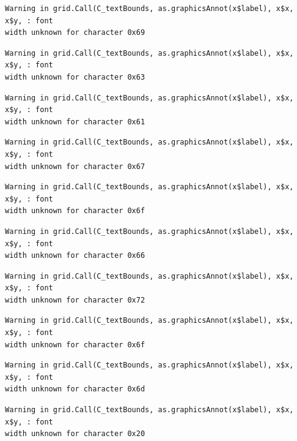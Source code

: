 \documentclass[
  letterpaper,
]{scrbook}
\begin{document}
\begin{verbatim}
Warning in grid.Call(C_textBounds, as.graphicsAnnot(x$label), x$x, x$y, : font
width unknown for character 0x69
\end{verbatim}

\begin{verbatim}
Warning in grid.Call(C_textBounds, as.graphicsAnnot(x$label), x$x, x$y, : font
width unknown for character 0x63
\end{verbatim}

\begin{verbatim}
Warning in grid.Call(C_textBounds, as.graphicsAnnot(x$label), x$x, x$y, : font
width unknown for character 0x61
\end{verbatim}

\begin{verbatim}
Warning in grid.Call(C_textBounds, as.graphicsAnnot(x$label), x$x, x$y, : font
width unknown for character 0x67
\end{verbatim}

\begin{verbatim}
Warning in grid.Call(C_textBounds, as.graphicsAnnot(x$label), x$x, x$y, : font
width unknown for character 0x6f
\end{verbatim}

\begin{verbatim}
Warning in grid.Call(C_textBounds, as.graphicsAnnot(x$label), x$x, x$y, : font
width unknown for character 0x66
\end{verbatim}

\begin{verbatim}
Warning in grid.Call(C_textBounds, as.graphicsAnnot(x$label), x$x, x$y, : font
width unknown for character 0x72
\end{verbatim}

\begin{verbatim}
Warning in grid.Call(C_textBounds, as.graphicsAnnot(x$label), x$x, x$y, : font
width unknown for character 0x6f
\end{verbatim}

\begin{verbatim}
Warning in grid.Call(C_textBounds, as.graphicsAnnot(x$label), x$x, x$y, : font
width unknown for character 0x6d
\end{verbatim}

\begin{verbatim}
Warning in grid.Call(C_textBounds, as.graphicsAnnot(x$label), x$x, x$y, : font
width unknown for character 0x20
\end{verbatim}
\end{document}
